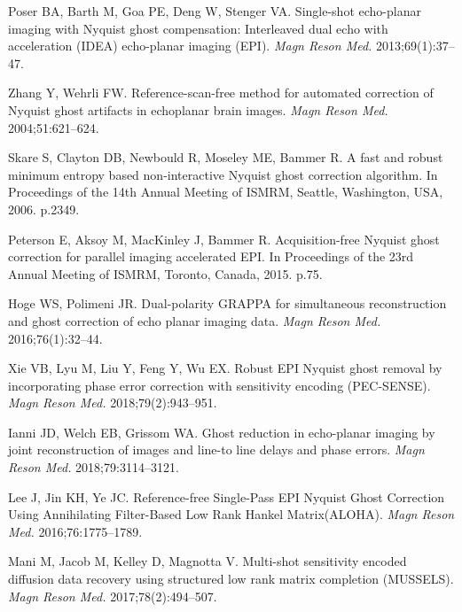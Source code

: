 \documentclass[num-refs]{wiley-article}
\newcommand{\0}{{\boldsymbol{0}}}
\newcommand{\1}{\blmath{1}}
\begin{document}
\begin{thebibliography}{10}
		Poser BA, Barth M, Goa PE, Deng W, Stenger VA. 
		\newblock Single-shot echo-planar imaging with Nyquist ghost compensation: Interleaved dual echo with acceleration (IDEA) echo-planar imaging (EPI).
		\newblock \textit{Magn Reson Med.} 2013;69(1):37–47.
		
		Zhang Y, Wehrli FW. 
		\newblock Reference-scan-free method for automated correction of Nyquist ghost artifacts in echoplanar
		brain images.
		\newblock \textit{Magn Reson Med.} 2004;51:621–624.
		
		Skare S, Clayton DB, Newbould R, Moseley ME, Bammer R.
		\newblock A fast and robust minimum entropy based non-interactive Nyquist ghost correction algorithm.
		\newblock In Proceedings of the 14th Annual Meeting of ISMRM, Seattle, Washington, USA, 2006. p.2349.
		
		Peterson E, Aksoy M, MacKinley J, Bammer R. 
		\newblock Acquisition-free Nyquist ghost correction for parallel imaging accelerated EPI.
		\newblock In Proceedings of the 23rd Annual Meeting of ISMRM, Toronto, Canada, 2015. p.75.
		
		Hoge WS, Polimeni JR.
		\newblock Dual-polarity GRAPPA for simultaneous reconstruction and ghost correction of echo planar imaging data.
		\newblock \textit{Magn Reson Med.} 2016;76(1):32–44.
		
		Xie VB, Lyu M, Liu Y, Feng Y, Wu EX. 
		\newblock Robust EPI Nyquist ghost removal by incorporating phase error correction with sensitivity encoding (PEC-SENSE).
		\newblock \textit{Magn Reson Med.} 2018;79(2):943–951.
		
		Ianni JD, Welch EB, Grissom WA. 
		\newblock Ghost reduction in echo-planar imaging by joint reconstruction of images and line-to line delays and phase errors.
		\newblock \textit{Magn Reson Med.} 2018;79:3114–3121.
		
		Lee J, Jin KH, Ye JC.
		\newblock Reference-free Single-Pass EPI Nyquist Ghost Correction Using Annihilating Filter-Based Low Rank
		Hankel Matrix(ALOHA).
		\newblock \textit{Magn Reson Med.} 2016;76:1775–1789.
		
		Mani M, Jacob M, Kelley D, Magnotta V. 
		\newblock Multi-shot sensitivity encoded diffusion data recovery using structured low rank matrix completion (MUSSELS).
		\newblock \textit{Magn Reson Med.} 2017;78(2):494–507.
		

\end{thebibliography}
\end{document}
